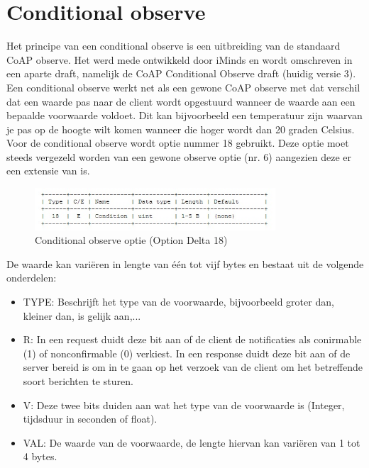 \section{Conditional observe}

Het principe van een conditional observe is een uitbreiding van de standaard CoAP observe. Het werd mede ontwikkeld door iMinds en wordt omschreven in een aparte draft, namelijk de
CoAP Conditional Observe draft (huidig versie 3).\\

Een conditional observe werkt net als een gewone CoAP observe met dat verschil dat een waarde pas naar de client wordt opgestuurd wanneer de waarde aan een bepaalde voorwaarde
voldoet. Dit kan bijvoorbeeld een temperatuur zijn waarvan je pas op de hoogte wilt komen wanneer die hoger wordt dan 20 graden Celsius.
Voor de conditional observe wordt optie nummer 18 gebruikt. Deze optie moet steeds vergezeld worden van een gewone observe optie (nr. 6) aangezien deze er een extensie van is.

\begin{figure}[h!]
\centering
\includegraphics[width=0.8\textwidth]{fig/conditional}
\caption{Conditional observe optie (Option Delta 18)}
\end{figure}

De waarde kan vari\"{e}ren in lengte van \'{e}\'{e}n tot vijf bytes en bestaat uit de volgende onderdelen:
\begin{itemize}
\item TYPE: Beschrijft het type van de voorwaarde, bijvoorbeeld groter dan, kleiner dan, is gelijk aan,...
\item R: In een request duidt deze bit aan of de client de notificaties als conirmable (1) of nonconfirmable (0) verkiest. In een response duidt deze bit aan of de server bereid is om in te gaan op het verzoek van de client om het betreffende soort berichten te sturen.
\item V: Deze twee bits duiden aan wat het type van de voorwaarde is (Integer, tijdsduur in seconden of float).
\item VAL: De waarde van de voorwaarde, de lengte hiervan kan vari\"{e}ren van 1 tot 4 bytes.
\end{itemize}

